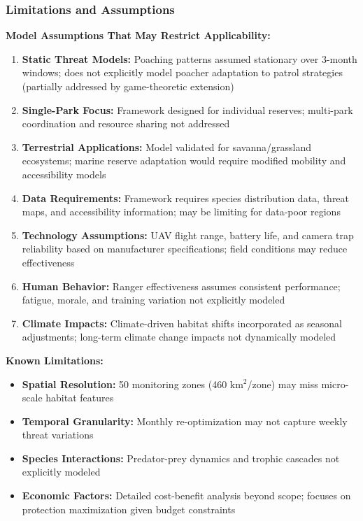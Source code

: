 \subsubsection{Limitations and Assumptions}

\textbf{Model Assumptions That May Restrict Applicability:}

\begin{enumerate}
    \item \textbf{Static Threat Models:} Poaching patterns assumed stationary over 3-month windows; does not explicitly model poacher adaptation to patrol strategies (partially addressed by game-theoretic extension)

    \item \textbf{Single-Park Focus:} Framework designed for individual reserves; multi-park coordination and resource sharing not addressed

    \item \textbf{Terrestrial Applications:} Model validated for savanna/grassland ecosystems; marine reserve adaptation would require modified mobility and accessibility models

    \item \textbf{Data Requirements:} Framework requires species distribution data, threat maps, and accessibility information; may be limiting for data-poor regions

    \item \textbf{Technology Assumptions:} UAV flight range, battery life, and camera trap reliability based on manufacturer specifications; field conditions may reduce effectiveness

    \item \textbf{Human Behavior:} Ranger effectiveness assumes consistent performance; fatigue, morale, and training variation not explicitly modeled

    \item \textbf{Climate Impacts:} Climate-driven habitat shifts incorporated as seasonal adjustments; long-term climate change impacts not dynamically modeled
\end{enumerate}

\textbf{Known Limitations:}

\begin{itemize}
    \item \textbf{Spatial Resolution:} 50 monitoring zones (460 km$^2$/zone) may miss micro-scale habitat features
    \item \textbf{Temporal Granularity:} Monthly re-optimization may not capture weekly threat variations
    \item \textbf{Species Interactions:} Predator-prey dynamics and trophic cascades not explicitly modeled
    \item \textbf{Economic Factors:} Detailed cost-benefit analysis beyond scope; focuses on protection maximization given budget constraints
\end{itemize}

